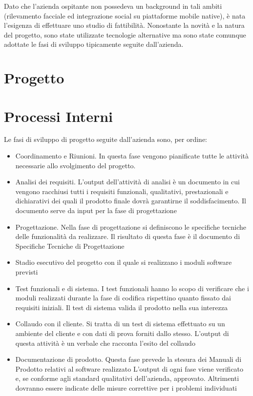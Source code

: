 Dato che l'azienda ospitante non possedeva un background in tali ambiti (rilevamento facciale ed integrazione social su piattaforme mobile native), è nata l'esigenza di effettuare uno studio di fattibilità. Nonostante la novità e la natura del progetto, sono state utilizzate tecnologie alternative ma sono state comunque adottate le fasi di sviluppo tipicamente seguite dall'azienda.

\section{Progetto}

\section{Processi Interni}

Le fasi di sviluppo di progetto seguite dall'azienda sono, per ordine:
\begin{itemize}

\item Coordinamento e Riunioni. In questa fase vengono pianificate tutte le attività necessarie allo
svolgimento del progetto.
\item Analisi dei requisiti. L'output dell'attività di analisi è un documento in cui vengono racchiusi
tutti i requisiti funzionali, qualitativi, prestazionali e dichiarativi dei quali il prodotto finale
dovrà garantirne il soddisfacimento. Il documento serve da input per la fase di progettazione
\item Progettazione. Nella fase di progettazione si definiscono le specifiche tecniche delle funzionalità
da realizzare. Il risultato di questa fase è il documento di Specifiche Tecniche di Progettazione
\item Stadio esecutivo del progetto con il quale si realizzano i moduli software previsti
\item Test funzionali e di sistema. I test funzionali hanno lo scopo di verificare che i moduli realizzati
durante la fase di codifica rispettino quanto fissato dai requisiti iniziali. Il test di sistema valida
il prodotto nella sua interezza
\item Collaudo con il cliente. Si tratta di un test di sistema effettuato su un ambiente del cliente
e con dati di prova forniti dallo stesso. L'output di questa attività è un verbale che racconta
l'esito del collaudo
\item Documentazione di prodotto. Questa fase prevede la stesura dei Manuali di Prodotto relativi
al software realizzato
L'output di ogni fase viene verificato e, se conforme agli standard qualitativi dell'azienda, approvato.
Altrimenti dovranno essere indicate delle misure correttive per i problemi individuati

\end{itemize}


